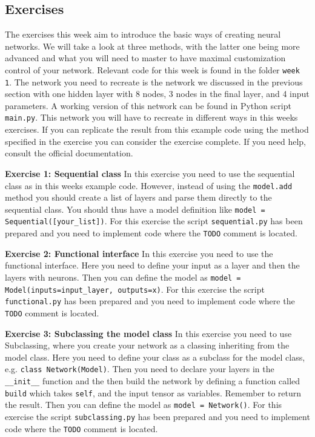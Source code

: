 \documentclass[12pt,a4paper]{article} %
\numberwithin{equation}{section}
\begin{document}
	\subsection{Exercises}
		The exercises this week aim to introduce the basic ways of creating neural networks. We will take a look at three methods, with the latter one being more advanced and what you will need to master to have maximal customization control of your network. Relevant code for this week is found in the folder \texttt{week 1}. The network you need to recreate is the network we discussed in the previous section with one hidden layer with 8 nodes, 3 nodes in the final layer, and 4 input parameters. A working version of this network can be found in Python script \texttt{main.py}. This network you will have to recreate in different ways in this weeks exercises. If you can replicate the result from this example code using the method specified in the exercise you can consider the exercise complete. If you need help, consult the official documentation. \newline
		
		\textbf{Exercise 1: Sequential class}\newline
		In this exercise you need to use the sequential class as in this weeks example code. However, instead of using the \texttt{model.add} method you should create a list of layers and parse them directly to the sequential class. You should thus have a model definition like \texttt{model = Sequential([your\_list])}. For this exercise the script \texttt{sequential.py} has been prepared and you need to implement code where the \texttt{TODO} comment is located.\newline
		
		\textbf{Exercise 2: Functional interface}\newline
		In this exercise you need to use the functional interface. Here you need to define your input as a layer and then the layers with neurons. Then you can define the model as \texttt{model = Model(inputs=input\_layer, outputs=x)}. For this exercise the script \texttt{functional.py} has been prepared and you need to implement code where the \texttt{TODO} comment is located.\newline
		
		\textbf{Exercise 3: Subclassing the model class}\newline
		In this exercise you need to use Subclassing, where you create your network as a classing inheriting from the model class. Here you need to define your class as a subclass for the model class, e.g. \texttt{class Network(Model)}. Then you need to declare your layers in the \texttt{\_\_init\_\_} function and the then build the network by defining a function called \texttt{build} which takes \texttt{self}, and the input tensor as variables. Remember to return the result. Then you can define the model as \texttt{model = Network()}. For this exercise the script \texttt{subclassing.py} has been prepared and you need to implement code where the \texttt{TODO} comment is located.\newline
		
\end{document}
